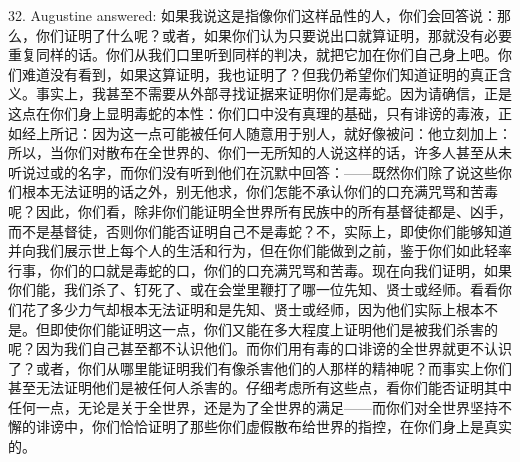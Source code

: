 32. Augustine answered: 如果我说这是指像你们这样品性的人，你们会回答说：那么，你们证明了什么呢？或者，如果你们认为只要说出口就算证明，那就没有必要重复同样的话。你们从我们口里听到同样的判决，就把它加在你们自己身上吧。你们难道没有看到，如果这算证明，我也证明了？但我仍希望你们知道证明的真正含义。事实上，我甚至不需要从外部寻找证据来证明你们是毒蛇。因为请确信，正是这点在你们身上显明毒蛇的本性：你们口中没有真理的基础，只有诽谤的毒液，正如经上所记：因为这一点可能被任何人随意用于别人，就好像被问：他立刻加上：所以，当你们对散布在全世界的、你们一无所知的人说这样的话，许多人甚至从未听说过或的名字，而你们没有听到他们在沉默中回答：——既然你们除了说这些你们根本无法证明的话之外，别无他求，你们怎能不承认你们的口充满咒骂和苦毒呢？因此，你们看，除非你们能证明全世界所有民族中的所有基督徒都是、凶手，而不是基督徒，否则你们能否证明自己不是毒蛇？不，实际上，即使你们能够知道并向我们展示世上每个人的生活和行为，但在你们能做到之前，鉴于你们如此轻率行事，你们的口就是毒蛇的口，你们的口充满咒骂和苦毒。现在向我们证明，如果你们能，我们杀了、钉死了、或在会堂里鞭打了哪一位先知、贤士或经师。看看你们花了多少力气却根本无法证明和是先知、贤士或经师，因为他们实际上根本不是。但即使你们能证明这一点，你们又能在多大程度上证明他们是被我们杀害的呢？因为我们自己甚至都不认识他们。而你们用有毒的口诽谤的全世界就更不认识了？或者，你们从哪里能证明我们有像杀害他们的人那样的精神呢？而事实上你们甚至无法证明他们是被任何人杀害的。仔细考虑所有这些点，看你们能否证明其中任何一点，无论是关于全世界，还是为了全世界的满足——而你们对全世界坚持不懈的诽谤中，你们恰恰证明了那些你们虚假散布给世界的指控，在你们身上是真实的。\par

